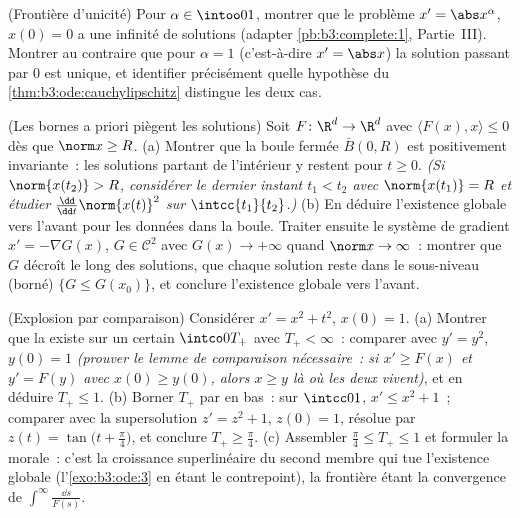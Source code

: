 \begin{exercise}[$\star\star$]\label{exo:b3:ode:9}
(Frontière d'unicité) Pour $\alpha \in \intoo01$, montrer que
le problème $x' = \abs x^{\alpha}$, $x(0) = 0$ a une infinité
de solutions (adapter \cref{pb:b3:complete:1}, Partie~III).
Montrer au contraire que pour $\alpha = 1$ (c'est-à-dire
$x' = \abs x$) la solution passant par $0$ est unique, et
identifier précisément quelle hypothèse du
\cref{thm:b3:ode:cauchylipschitz} distingue les deux cas.
\end{exercise}

\begin{exercise}[$\star\star\star$]\label{exo:b3:ode:10}
(Les bornes a priori piègent les solutions) Soit $F \colon
\R^d \to \R^d$  avec $\langle F(x),
x\rangle \leq 0$ dès que $\norm x \geq R$.
(a) Montrer que la boule fermée $\bar B(0, R)$ est
positivement invariante~: les solutions partant de l'intérieur
y restent pour $t \geq 0$. \emph{(Si $\norm{x(t_2)} > R$,
considérer le dernier instant $t_1 < t_2$ avec
$\norm{x(t_1)} = R$ et étudier $\frac{\dd}{\dd
t}\norm{x(t)}^2$ sur $\intcc{t_1}{t_2}$.)}
(b) En déduire l'existence globale vers l'avant pour les
données dans la boule. Traiter ensuite le système de gradient
$x' = -\nabla G(x)$, $G \in \mathcal C^2$ avec $G(x) \to
+\infty$ quand $\norm x \to \infty$~: montrer que $G$ décroît
le long des solutions, que chaque solution reste dans le
sous-niveau (borné) $\{G \leq G(x_0)\}$, et conclure
l'existence globale vers l'avant.
\end{exercise}

\begin{exercise}[$\star\star$]\label{exo:b3:ode:11}
(Explosion par comparaison) Considérer $x' = x^2 + t^2$,
$x(0) = 1$.
(a) Montrer que la  existe sur un certain
$\intco0{T_+}$ avec $T_+ < \infty$~: comparer avec $y' =
y^2$, $y(0) = 1$ \emph{(prouver le lemme de comparaison
nécessaire~: si $x' \geq F(x)$ et $y' = F(y)$ avec $x(0)
\geq y(0)$, alors $x \geq y$ là où les deux vivent)}, et en
déduire $T_+ \leq 1$.
(b) Borner $T_+$ par en bas~: sur $\intcc01$, $x' \leq x^2 +
1$~; comparer avec la supersolution $z' = z^2 + 1$, $z(0) =
1$, résolue par $z(t) = \tan\bigl(t + \frac\pi4\bigr)$, et
conclure $T_+ \geq \frac\pi4$.
(c) Assembler $\frac\pi4 \leq T_+ \leq 1$ et formuler la
morale~: c'est la croissance superlinéaire du second membre
qui tue l'existence globale (l'\cref{exo:b3:ode:3} en étant
le contrepoint), la frontière étant la convergence de
$\int^{\infty}\frac{\dd s}{F(s)}$.
\end{exercise}

